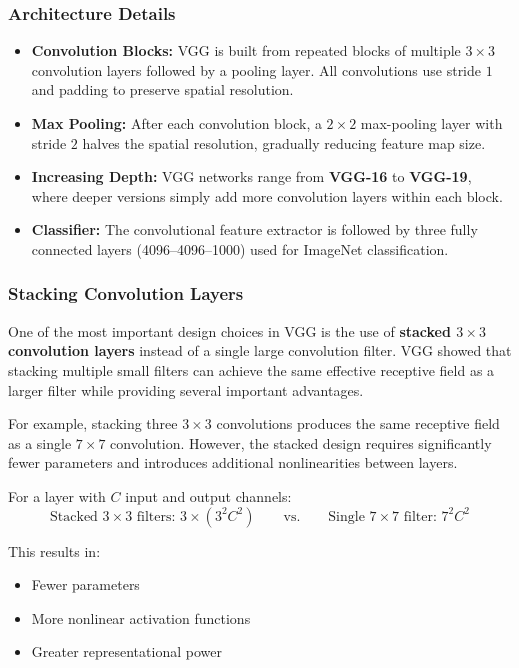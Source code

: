 \documentclass{article}
\begin{document}
\subsubsection{Architecture Details}
\begin{itemize}
    \item \textbf{Convolution Blocks:}  
    VGG is built from repeated blocks of multiple \(3\times3\) convolution layers 
    followed by a pooling layer. All convolutions use stride \(1\) and padding to 
    preserve spatial resolution.

    \item \textbf{Max Pooling:}  
    After each convolution block, a \(2\times2\) max-pooling layer with stride \(2\) 
    halves the spatial resolution, gradually reducing feature map size.

    \item \textbf{Increasing Depth:}  
    VGG networks range from \textbf{VGG-16} to \textbf{VGG-19}, where deeper versions 
    simply add more convolution layers within each block.

    \item \textbf{Classifier:}  
    The convolutional feature extractor is followed by three fully connected layers 
    (4096–4096–1000) used for ImageNet classification.
\end{itemize}

\subsubsection{Stacking Convolution Layers}

One of the most important design choices in VGG is the use of \textbf{stacked $3\times3$ convolution layers} instead of a single large convolution filter. VGG showed that stacking multiple small filters can achieve the same effective receptive field as a larger filter while providing several important advantages.

For example, stacking three $3\times3$ convolutions produces the same receptive field as a single $7\times7$ convolution. However, the stacked design requires significantly fewer parameters and introduces additional nonlinearities between layers.

For a layer with $C$ input and output channels:
\[
\text{Stacked }3\times3\text{ filters: } 3 \times (3^2 C^2) 
\qquad \text{vs.} \qquad
\text{Single }7\times7\text{ filter: } 7^2 C^2
\]

This results in:
\begin{itemize}
    \item Fewer parameters
    \item More nonlinear activation functions
    \item Greater representational power
\end{itemize}
\end{document}
